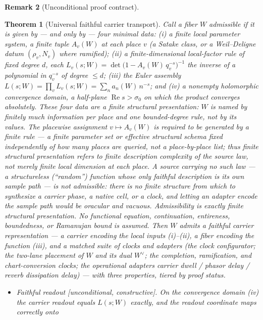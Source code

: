 \documentclass[11pt]{article}
\newtheorem{theorem}{Theorem}
\theoremstyle{definition}
\newtheorem{remark}[theorem]{Remark}
\renewcommand{\Re}{\operatorname{Re}}
\begin{document}
\begin{remark}[Unconditional proof contract]
\begin{enumerate}
\begin{theorem}[Universal faithful carrier transport]\label{thm:universal}
Call a fiber $W$ \emph{admissible} if it is given by --- and only by --- four minimal data: \emph{(i)} a
\emph{finite local parameter system}, a finite tuple $A_v(W)$ at each place $v$ (a Satake class, or a
Weil--Deligne datum $(\rho_v,N_v)$ where ramified); \emph{(ii)} a \emph{finite-dimensional local-factor rule} of
fixed degree $d$, each $L_v(s;W)=\det\!\big(1-A_v(W)\,q_v^{-s}\big)^{-1}$ the inverse of a polynomial in
$q_v^{-s}$ of degree $\le d$; \emph{(iii)} the \emph{Euler assembly}
$L(s;W)=\prod_v L_v(s;W)=\sum_n a_n(W)\,n^{-s}$; and \emph{(iv)} a \emph{nonempty holomorphic convergence domain},
a half-plane $\Re s>\sigma_0$ on which the product converges absolutely. These four data are a \emph{finite structural presentation}: $W$ is named by finitely much information per place and one bounded-degree rule, not by its values. The placewise assignment $v\mapsto A_v(W)$ is required to be generated by a \emph{finite rule} --- a finite parameter set or effective structural schema fixed independently of how many places are queried, not a place-by-place list; thus finite structural presentation refers to finite description complexity of the source law, not merely finite local dimension at each place. A source carrying \emph{no} such law --- a structureless (``random'') function whose only faithful description is its own sample path --- is \emph{not} admissible: there is no finite structure from which to synthesize a carrier phase, a native cell, or a clock, and letting an adapter encode the sample path would be oracular and vacuous. Admissibility is \emph{exactly} finite structural presentation. \emph{No functional equation,
continuation, entireness, boundedness, or Ramanujan bound is assumed.} Then $W$ admits a \emph{faithful carrier
representation} --- a carrier encoding the local inputs \emph{(i)--(ii)}, a fiber encoding the function
\emph{(iii)}, and a matched suite of clocks and adapters (the clock configurator; the two-lane placement of $W$
and its dual $W^\vee$; the completion, ramification, and chart-conversion clocks; the operational adapters
carrier dwell / phasor delay / reverb dissipation delay) --- with three properties, tiered by proof status.
\begin{itemize}
\item[\textup{(a)}] \emph{Faithful readout} \textup{[unconditional, constructive]}. On the convergence domain
\emph{(iv)} the carrier readout equals $L(s;W)$ exactly, and the readout coordinate maps correctly onto

\end{itemize}
\end{theorem}
\end{enumerate}
\end{remark}
\end{document}

